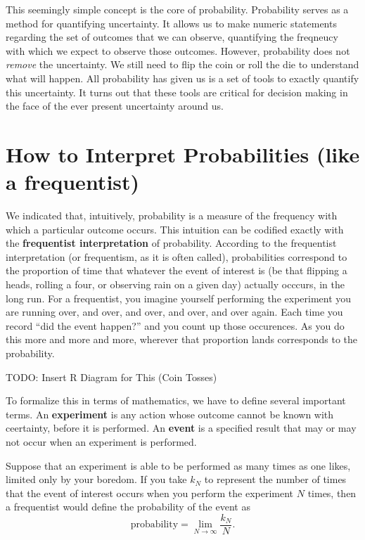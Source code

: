 \documentclass[
  letterpaper,
  DIV=11,
  numbers=noendperiod]{scrreprt}
\begin{document}
This seemingly simple concept is the core of probability. Probability
serves as a method for quantifying uncertainty. It allows us to make
numeric statements regarding the set of outcomes that we can observe,
quantifying the freqneucy with which we expect to observe those
outcomes. However, probability does not \emph{remove} the uncertainty.
We still need to flip the coin or roll the die to understand what will
happen. All probability has given us is a set of tools to exactly
quantify this uncertainty. It turns out that these tools are critical
for decision making in the face of the ever present uncertainty around
us.

\section{How to Interpret Probabilities (like a
frequentist)}\label{how-to-interpret-probabilities-like-a-frequentist}

We indicated that, intuitively, probability is a measure of the
frequency with which a particular outcome occurs. This intuition can be
codified exactly with the \textbf{frequentist interpretation} of
probability. According to the frequentist interpretation (or
frequentism, as it is often called), probabilities correspond to the
proportion of time that whatever the event of interest is (be that
flipping a heads, rolling a four, or observing rain on a given day)
actually occcurs, in the long run. For a frequentist, you imagine
yourself performing the experiment you are running over, and over, and
over, and over, and over again. Each time you record ``did the event
happen?'' and you count up those occurences. As you do this more and
more and more, wherever that proportion lands corresponds to the
probability.

TODO: Insert R Diagram for This (Coin Tosses)

To formalize this in terms of mathematics, we have to define several
important terms. An \textbf{experiment} is any action whose outcome
cannot be known with ceertainty, before it is performed. An
\textbf{event} is a specified result that may or may not occur when an
experiment is performed.

Suppose that an experiment is able to be performed as many times as one
likes, limited only by your boredom. If you take \(k_N\) to represent
the number of times that the event of interest occurs when you perform
the experiment \(N\) times, then a frequentist would define the
probability of the event as
\[\text{probability} = \lim_{N\to\infty}\frac{k_N}{N}.\]
\end{document}
